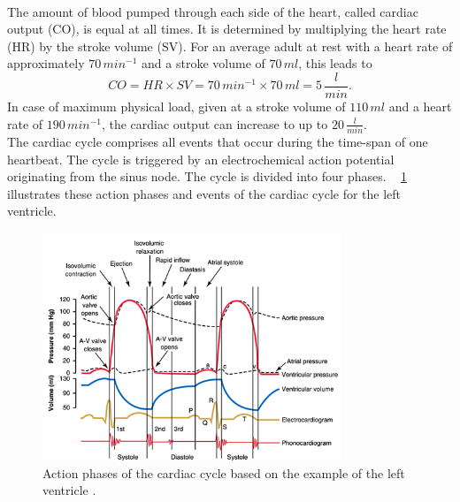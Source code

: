 \\ The amount of blood pumped through each side of the heart,  called cardiac output (CO), is equal at all times. It is determined by multiplying the heart rate (HR) by the stroke volume (SV). For an average adult at rest with a heart rate of approximately $70\, min^{-1}$ and a stroke volume of $70 \, ml$, this leads to
 \begin{equation}
   CO = HR \times SV = 70\, min^{-1} \times 70 \,ml = 5 \,\frac{l}{min}.
  \label{eq:CO}
 \end{equation}
In case of maximum physical load, given at a stroke volume of $110\,ml$ and a heart rate of $190 \, min^{-1}$,  the cardiac output can increase to up to $20\,\frac{l}{min}$. \cite{HKS4}
\\The cardiac cycle comprises all events that occur during the time-span of one heartbeat. The cycle is triggered by an electrochemical action potential originating from the sinus node. The cycle is divided into four phases. \figurename~ \ref{fig:cardiac_cycle} illustrates these action phases and events of the cardiac cycle for the left ventricle.
\begin{figure}[ht]
  \centering
  \includegraphics[width=0.8\textwidth]{images/chapt_2/cardiac_cycle.jpg}
  \caption[Action phases of left ventricular cardiac cycle \cite{GH20}]{Action phases of the cardiac cycle based on the example of the left ventricle \cite{GH20}.}
  \label{fig:cardiac_cycle}
\end{figure}
